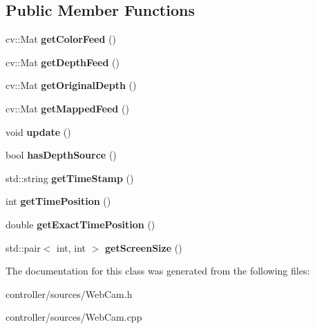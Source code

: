 \subsection*{Public Member Functions}
\begin{DoxyCompactItemize}
\item 
\mbox{\label{class_web_cam_afe33019aa4a2cbf492c67d70ec95a9be}} 
cv\+::\+Mat {\bfseries get\+Color\+Feed} ()
\item 
\mbox{\label{class_web_cam_a0c177c80bb84d41f2a79240f1e15989b}} 
cv\+::\+Mat {\bfseries get\+Depth\+Feed} ()
\item 
\mbox{\label{class_web_cam_acf080531c8633a52566f09e5c4c33f74}} 
cv\+::\+Mat {\bfseries get\+Original\+Depth} ()
\item 
\mbox{\label{class_web_cam_ab2192287069a02c760b1f097e552ad1f}} 
cv\+::\+Mat {\bfseries get\+Mapped\+Feed} ()
\item 
\mbox{\label{class_web_cam_a2edeaf1bb8cd9f8cb32bd59b79a2d94a}} 
void {\bfseries update} ()
\item 
\mbox{\label{class_web_cam_a369f819e5e6c38b6bb918e5eaefe4913}} 
bool {\bfseries has\+Depth\+Source} ()
\item 
\mbox{\label{class_web_cam_ad34c9510ff27c2bb7c612b1354dcb0a5}} 
std\+::string {\bfseries get\+Time\+Stamp} ()
\item 
\mbox{\label{class_web_cam_a33019db4995dfa30539d8992b0a91a2b}} 
int {\bfseries get\+Time\+Position} ()
\item 
\mbox{\label{class_web_cam_aa2e19da066a26f14dbb4a0533750f691}} 
double {\bfseries get\+Exact\+Time\+Position} ()
\item 
\mbox{\label{class_web_cam_a59eda3f925331c7011830f8da46a45f5}} 
std\+::pair$<$ int, int $>$ {\bfseries get\+Screen\+Size} ()
\end{DoxyCompactItemize}


The documentation for this class was generated from the following files\+:\begin{DoxyCompactItemize}
\item 
controller/sources/Web\+Cam.\+h\item 
controller/sources/Web\+Cam.\+cpp\end{DoxyCompactItemize}
